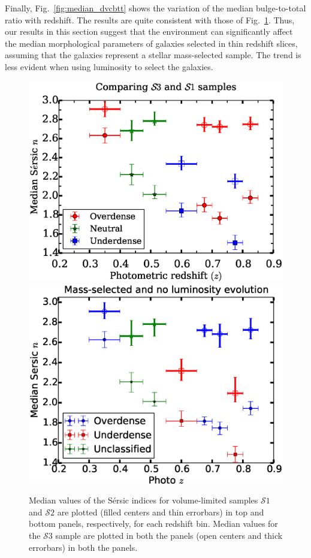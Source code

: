 \documentclass[twocolumn,useAMS,usenatbib]{mn2e}
\newcommand{\sersic}{S\'{e}rsic }
\newcommand{\s}{\ensuremath{\mathcal{S}}}
\begin{document}
Finally, Fig.~\ref{fig:median_dvcbtt} shows the variation of the median
bulge-to-total ratio with redshift. The results are quite consistent
with those of Fig.~\ref{fig:median_sersicn}. 
Thus, our results in this section suggest that the 
environment can significantly affect the median morphological
parameters of galaxies selected in thin redshift
slices, assuming that the galaxies represent a stellar mass-selected
sample.  The trend is less evident when using luminosity to select the
galaxies.

\begin{figure}
 \includegraphics[width=1.0\columnwidth]{median_sersicn}
 \includegraphics[width=1.0\columnwidth]{median_sersicn2}
 \caption{Median values of the \sersic indices for volume-limited
   samples \s$1$ and \s$2$ are plotted (filled centers and thin
   errorbars) in top and bottom panels, respectively, for each
   redshift bin. 
          Median values for the \s$3$ sample are plotted in both the
          panels (open centers and thick errorbars) in both the
          panels.
     }
 \label{fig:median_sersicn}
\end{figure}
\end{document}
